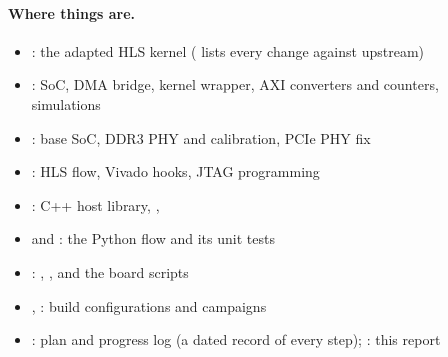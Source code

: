 \paragraph{Where things are.}
\begin{itemize}
  \item {}: the adapted HLS kernel ( lists every change against upstream)
  \item {}: SoC, DMA bridge, kernel wrapper, AXI converters and counters, simulations
  \item {}: base SoC, DDR3 PHY and calibration, PCIe PHY fix
  \item {}: HLS flow, Vivado hooks, JTAG programming
  \item {}: C++ host library, , 
  \item {} and : the Python flow and its unit tests
  \item {}: , ,  and the board scripts
  \item {}, : build configurations and campaigns
  \item {}: plan and progress log (a dated record of every step); : this report
\end{itemize}
